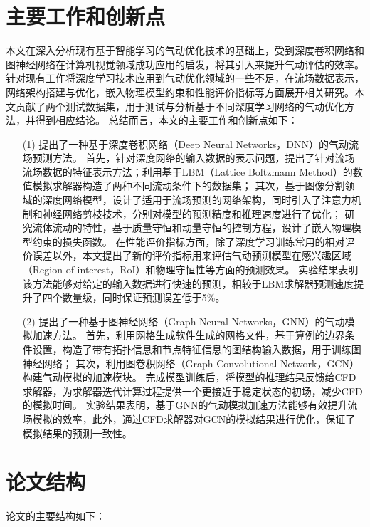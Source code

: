 \section{主要工作和创新点}
本文在深入分析现有基于智能学习的气动优化技术的基础上，受到深度卷积网络和图神经网络在计算机视觉领域成功应用的启发，将其引入来提升气动评估的效率。针对现有工作将深度学习技术应用到气动优化领域的一些不足，在流场数据表示，网络架构搭建与优化，嵌入物理模型约束和性能评价指标等方面展开相关研究。本文贡献了两个测试数据集，用于测试与分析基于不同深度学习网络的气动优化方法，并得到相应结论。
总结而言，本文的主要工作和创新点如下：
\begin{itemize}
	\item[(1)] 提出了一种基于深度卷积网络（Deep Neural Networks，DNN）的气动流场预测方法。
	首先，针对深度网络的输入数据的表示问题，提出了针对流场流场数据的特征表示方法；利用基于LBM（Lattice Boltzmann Method）的数值模拟求解器构造了两种不同流动条件下的数据集；
	其次，基于图像分割领域的深度网络模型，设计了适用于流场预测的网络架构，同时引入了注意力机制和神经网络剪枝技术，分别对模型的预测精度和推理速度进行了优化；
	研究流体流动的特性，基于质量守恒和动量守恒的控制方程，设计了嵌入物理模型约束的损失函数。
	在性能评价指标方面，除了深度学习训练常用的相对评价误差以外，本文提出了新的评价指标用来评估气动预测模型在感兴趣区域（Region of  interest，RoI）和物理守恒性等方面的预测效果。
	实验结果表明该方法能够对给定的输入数据进行快速的预测，相较于LBM求解器预测速度提升了四个数量级，同时保证预测误差低于5\%。
		
	
	\item[(2)] 提出了一种基于图神经网络（Graph Neural  Networks，GNN）的气动模拟加速方法。
	首先，利用网格生成软件生成的网格文件，基于算例的边界条件设置，构造了带有拓扑信息和节点特征信息的图结构输入数据，用于训练图神经网络；
	其次，利用图卷积网络（Graph  Convolutional Network，GCN）构建气动模拟的加速模块。
	完成模型训练后，将模型的推理结果反馈给CFD求解器，为求解器迭代计算过程提供一个更接近于稳定状态的初场，减少CFD的模拟时间。
	实验结果表明，基于GNN的气动模拟加速方法能够有效提升流场模拟的效率，此外，通过CFD求解器对GCN的模拟结果进行优化，保证了模拟结果的预测一致性。
	
	
	
	
\end{itemize}

\section{论文结构}
论文的主要结构如下：


